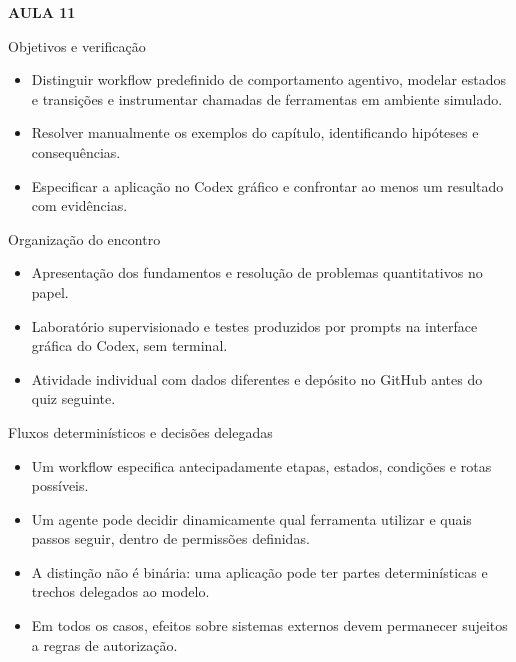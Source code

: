 \documentclass[10pt,aspectratio=169]{beamer}
\begin{document}
\begin{frame}[t]{}
\vspace{14mm}\textcolor{InsperRed}{\bfseries AULA 11}\par\vspace{4mm}{\LARGE\bfseries Workflows e agentes de IA}\par\vspace{6mm}{\large Operações empresariais}\par{}
\end{frame}

\begin{frame}[t]{Objetivos e verificação}
\small
\begin{itemize}
\item Distinguir workflow predefinido de comportamento agentivo, modelar estados e transições e instrumentar chamadas de ferramentas em ambiente simulado.
\item Resolver manualmente os exemplos do capítulo, identificando hipóteses e consequências.
\item Especificar a aplicação no Codex gráfico e confrontar ao menos um resultado com evidências.
\end{itemize}
\end{frame}

\begin{frame}[t]{Organização do encontro}
\small
\begin{itemize}
\item Apresentação dos fundamentos e resolução de problemas quantitativos no papel.
\item Laboratório supervisionado e testes produzidos por prompts na interface gráfica do Codex, sem terminal.
\item Atividade individual com dados diferentes e depósito no GitHub antes do quiz seguinte.
\end{itemize}
\end{frame}

\begin{frame}[t]{Fluxos determinísticos e decisões delegadas}
\small
\begin{itemize}
\item Um workflow especifica antecipadamente etapas, estados, condições e rotas possíveis.
\item Um agente pode decidir dinamicamente qual ferramenta utilizar e quais passos seguir, dentro de permissões definidas.
\item A distinção não é binária: uma aplicação pode ter partes determinísticas e trechos delegados ao modelo.
\item Em todos os casos, efeitos sobre sistemas externos devem permanecer sujeitos a regras de autorização.
\end{itemize}
\end{frame}
\end{document}
